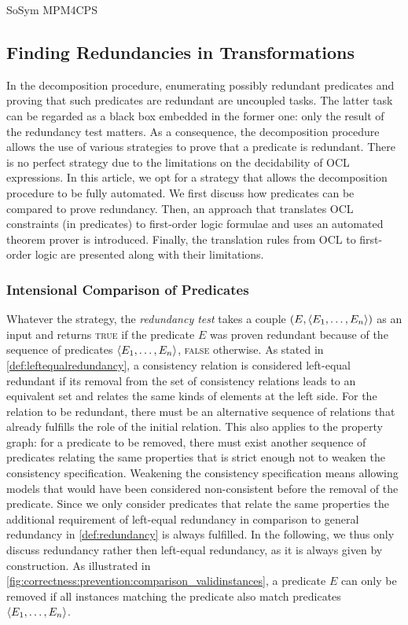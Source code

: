 \begin{copiedFrom}{SoSym MPM4CPS}

\subsection{Finding Redundancies in Transformations}
\label{chap:prevention:compatibility:redundancies}


In the decomposition procedure, enumerating possibly redundant predicates and proving that such predicates are redundant are uncoupled tasks. The latter task can be regarded as a black box embedded in the former one: only the result of the redundancy test matters. As a consequence, the decomposition procedure allows the use of various strategies to prove that a predicate is redundant. There is no perfect strategy due to the limitations on the decidability of OCL expressions. In this article, we opt for a strategy that allows the decomposition procedure to be fully automated. We first discuss how predicates can be compared to prove redundancy. Then, an approach that translates OCL constraints (in predicates) to first-order logic formulae and uses an automated theorem prover is introduced. Finally, the translation rules from OCL to first-order logic are presented along with their limitations.

\subsubsection{Intensional Comparison of Predicates}

Whatever the strategy, the \textit{redundancy test} takes a couple $(E, \langle E_1, \dots, E_n \rangle)$ as an input and returns \textsc{true} if the predicate $E$ was proven redundant because of the sequence of predicates $\langle E_1, \dots, E_n \rangle$, \textsc{false} otherwise. As stated in \autoref{def:leftequalredundancy}, a consistency relation is considered left-equal redundant if its removal from the set of consistency relations leads to an equivalent set and relates the same kinds of elements at the left side. For the relation to be redundant, there must be an alternative sequence of relations that already fulfills the role of the initial relation. This also applies to the property graph: for a predicate to be removed, there must exist another sequence of predicates relating the same properties that is strict enough not to weaken the consistency specification. Weakening the consistency specification means allowing models that would have been considered non-consistent before the removal of the predicate. 
Since we only consider predicates that relate the same properties the additional requirement of left-equal redundancy in comparison to general redundancy in \autoref{def:redundancy} is always fulfilled. In the following, we thus only discuss redundancy rather then left-equal redundancy, as it is always given by construction.
As illustrated in \autoref{fig:correctness:prevention:comparison_validinstances}, a predicate $E$ can only be removed if all instances matching the predicate also match predicates $\langle E_1, \dots, E_n \rangle$.


\end{copiedFrom}
